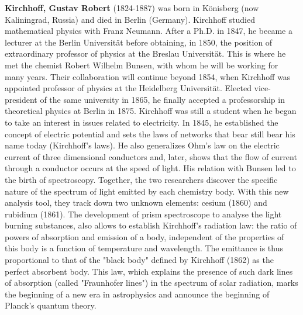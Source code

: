 \textbf{Kirchhoff, Gustav Robert} (1824-1887) was born in Könisberg (now Kaliningrad, Russia) and died in Berlin (Germany). Kirchhoff studied mathematical physics with Franz Neumann. After a Ph.D. in 1847, he became a lecturer at the Berlin Universität  before obtaining, in 1850, the position of extraordinary professor of physics at the Breslau Universität. This is where he met the chemist Robert Wilhelm Bunsen, with whom he will be working for many years. Their collaboration will continue beyond 1854, when Kirchhoff was appointed professor of physics at the  Heidelberg Universität. Elected vice-president of the same university in 1865, he finally accepted a professorship in theoretical physics at Berlin in 1875. Kirchhoff was still a student when he began to take an interest in issues related to electricity. In 1845, he established the concept of electric potential and sets the laws of networks that bear still bear his name today (Kirchhoff's laws). He also generalizes Ohm's law on the electric current of three dimensional conductors and, later, shows that the flow of current through a conductor occurs at the speed of light. His relation with Bunsen led to the birth of spectroscopy. Together, the two researchers discover the specific nature of the spectrum of light emitted by each chemistry body. With this new analysis tool, they track down two unknown elements: cesium (1860) and rubidium (1861). The development of prism spectroscope to analyse the light burning substances, also allows to establish Kirchhoff's radiation law: the ratio of powers of absorption and emission of a body, independent of the properties of this body is a function of temperature and wavelength. The emittance is thus proportional to that of the "black body" defined by Kirchhoff (1862) as the perfect absorbent body. This law, which explains the presence of such dark lines of absorption (called "Fraunhofer lines") in the spectrum of solar radiation, marks the beginning of a new era in astrophysics and announce the beginning of Planck's quantum theory.

